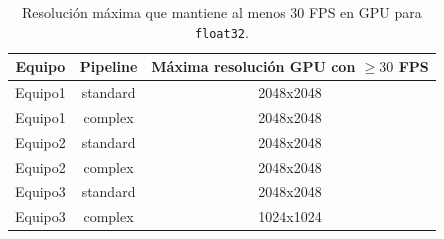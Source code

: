 \begin{table}[htbp]
\centering
\renewcommand{\arraystretch}{1.2}
\setlength{\tabcolsep}{8pt}
\begin{tabular}{|c|c|c|}
\hline
\rowcolor[gray]{0.90}
\textbf{Equipo} & \textbf{Pipeline} & \textbf{Máxima resolución GPU con $\geq 30$ FPS} \\
\hline
Equipo1 & standard & 2048x2048 \\
\hline
Equipo1 & complex & 2048x2048 \\
\hline
Equipo2 & standard & 2048x2048 \\
\hline
Equipo2 & complex & 2048x2048 \\
\hline
Equipo3 & standard & 2048x2048 \\
\hline
Equipo3 & complex & 1024x1024 \\
\hline
\end{tabular}
\caption{Resolución máxima que mantiene al menos 30 FPS en GPU para \texttt{float32}.}
\label{tab:interteam_realtime_thresholds_30fps}
\end{table}
